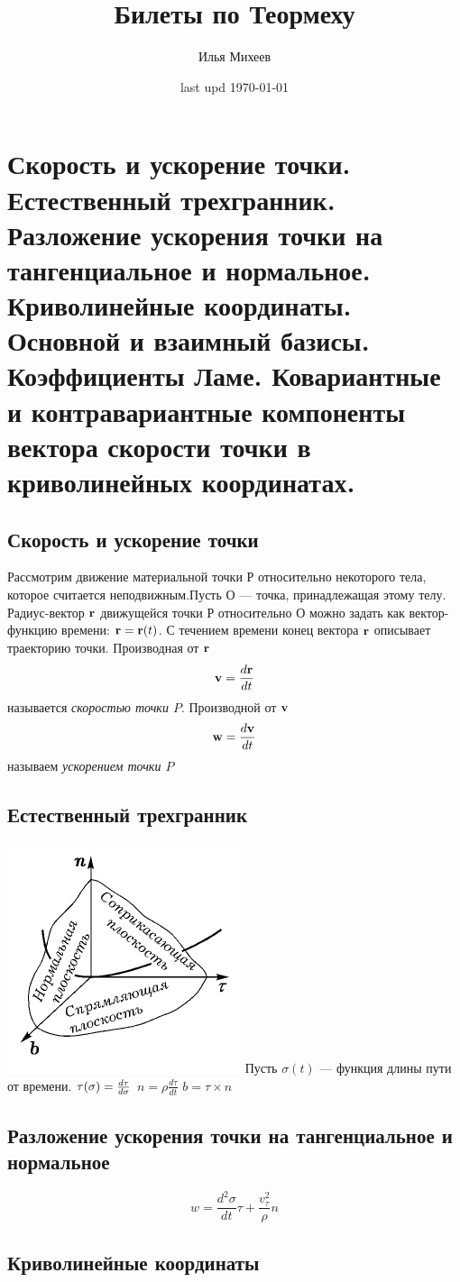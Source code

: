 \documentclass[a4paper,12pt]{article} %
\author{Илья Михеев}
\title{Билеты по Теормеху}
\date{last upd \today  }
\theoremstyle{definition}
\begin{document}
	
\maketitle 

\section{Скорость и ускорение точки. Естественный трехгранник. Разложение ускорения точки на тангенциальное и нормальное. Криволинейные координаты. Основной и взаимный базисы. Коэффициенты Ламе. Ковариантные и контравариантные компоненты вектора скорости точки в криволинейных координатах. }
\subsection{Скорость и ускорение точки}
 Рассмотрим движение материальной точки $Р$ относительно некоторого тела, которое считается неподвижным.Пусть $О$ --- точка, принадлежащая этому телу. Радиус-вектор $\bf r$ движущейся точки $Р$ относительно $О$ можно задать как вектор-функцию времени: ${\bf r = r}(t)$. С течением времени конец вектора $\bf r$ описывает траекторию точки. Производная от $\bf r$
 \begin{equation}
 	{\bf v}= \frac{d \bf{r}}{d t}
 \end{equation}
называется {\it скоростью точки $P$}. Производной от ${\bf v}$
\begin{equation}
	{\bf w} = \frac{d \bf v}{d t}
\end{equation}
называем {\it ускорением точки $P$}
\subsection{Естественный трехгранник}
\includegraphics{1_1.png}
Пусть $\sigma (t)$ --- функция длины пути от времени. ${ \tau} (\sigma) = \frac{d \bf \tau}{d \sigma}$ $n = \rho \frac{d \tau}{d t} $ $b = \tau \times n$
\subsection{Разложение ускорения точки на тангенциальное и нормальное}
\begin{equation}
	w = \frac{d^2 \sigma}{d t} \tau + \frac{v_{\tau}^2}{\rho} n 
\end{equation}
\subsection{Криволинейные координаты}
\end{document}
